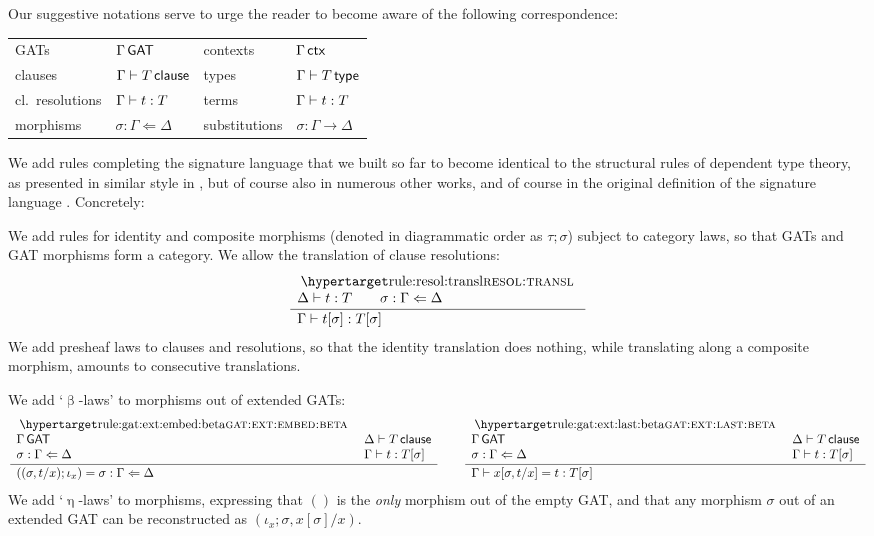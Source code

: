 \documentclass[a4paper]{article}
\begin{document}
Our suggestive notations serve to urge the reader to become aware of the following correspondence:
\begin{center}
	\begin{tabular}{l l | l l}
		& \text{GAT signature language} && \text{type theory} \\ \hline
		GATs & $\Gamma \,\mathsf{GAT}$ & contexts & $\Gamma \,\mathsf{ctx}$ \\
		clauses & $\Gamma \vdash T \,\mathsf{clause}$ & types & $\Gamma \vdash T \,\mathsf{type}$ \\
		cl.\ resolutions & $\Gamma \vdash t : T$ & terms & $\Gamma \vdash t : T$ \\
		morphisms & $\sigma : \Gamma \Leftarrow \Delta$ & substitutions & $\sigma : \Gamma \to \Delta$
	\end{tabular}
\end{center}

We add rules completing the signature language that we built so far to become identical to the structural rules of dependent type theory, as presented in similar style in \cite[\S 3.2.1-3.2.2]{nuyts-phd}, but of course also in numerous other works, and of course in the original definition of the signature language \cite{constructing-qiits}. Concretely:

We add rules for identity and composite morphisms (denoted in diagrammatic order as $\tau ; \sigma$) subject to category laws, so that GATs and GAT morphisms form a category.
We allow the translation of clause resolutions:
\[
	\inferencel{resol:transl}{
		\Delta \sez t : T \qquad
		\sigma : \Gamma \Leftarrow \Delta
	}{
		\Gamma \sez t[\sigma] : T[\sigma]
	}{}
\]
We add presheaf laws to clauses and resolutions, so that the identity translation does nothing, while translating along a composite morphism, amounts to consecutive translations.

We add `$\upbeta$-laws' to morphisms out of extended GATs:
\[
	\inferencel{gat:ext:embed:beta}{
		\Gamma \GAT &
		\Delta \sez T \clause \\
		\sigma : \Gamma \Leftarrow \Delta &
		\Gamma \sez t : T[\sigma]
	}{
		((\sigma, t/x) ; \iota_x) = \sigma : \Gamma \Leftarrow \Delta
	}{}
	\qquad
	\inferencel{gat:ext:last:beta}{
		\Gamma \GAT &
		\Delta \sez T \clause \\
		\sigma : \Gamma \Leftarrow \Delta &
		\Gamma \sez t : T[\sigma]
	}{
		\Gamma \sez x[\sigma, t/x] = t : T[\sigma]
	}{}
\]
We add `$\upeta$-laws' to morphisms, expressing that $()$ is the \emph{only} morphism out of the empty GAT, and that any morphism $\sigma$ out of an extended GAT can be reconstructed as $(\iota_x ; \sigma, x[\sigma]/x)$.
\end{document}
